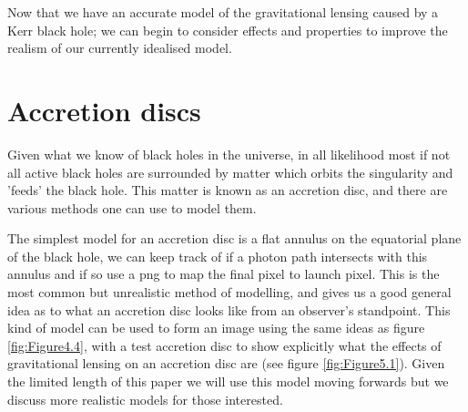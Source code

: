 \documentclass[oneside,openright,frontopenright, singlespacing]{dmathesis}
\begin{document}
	Now that we have an accurate model of the gravitational lensing caused by a Kerr black hole; we can begin to consider effects and properties to improve the realism of our currently idealised model.

\section{Accretion discs}\label{sec:Section5.1}

	Given what we know of black holes in the universe, in all likelihood most if not all active black holes are surrounded by matter which orbits the singularity and 'feeds' the black hole. This matter is known as an accretion disc, and there are various methods one can use to model them.

\vspace{1em}
	The simplest model for an accretion disc is a flat annulus on the equatorial plane of the black hole, we can keep track of if a photon path intersects with this annulus and if so use a png to map the final pixel to launch pixel. This is the most common but unrealistic method of modelling, and gives us a good general idea as to what an accretion disc looks like from an observer's standpoint. This kind of model can be used to form an image using the same ideas as figure \ref{fig:Figure4.4}, with a test accretion disc to show explicitly what the effects of gravitational lensing on an accretion disc are (see figure \ref{fig:Figure5.1}). Given the limited length of this paper we will use this model moving forwards but we discuss more realistic models for those interested.
\end{document}
